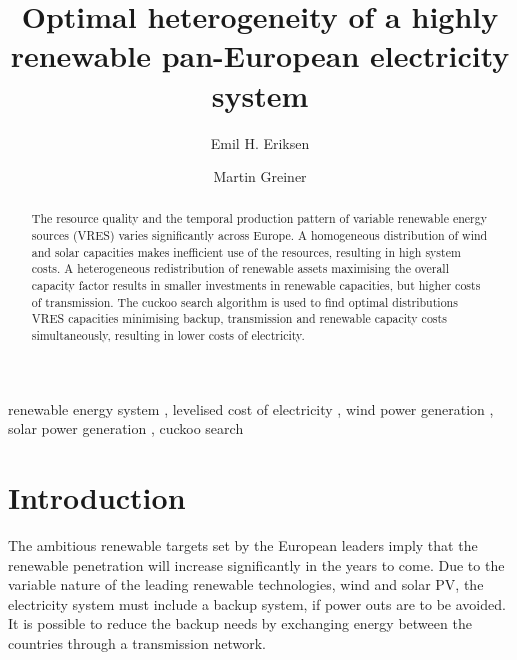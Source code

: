 \documentclass[a4paper, 12pt, sort&compress]{elsarticle}%
\begin{document}
\begin{frontmatter}

\title{Optimal heterogeneity of a highly renewable pan-European electricity system}

\author[label1]{Emil H. Eriksen}
\author[label2,label3]{Martin Greiner}
\address[label1]{Department of Physics and Astronomy, Aarhus University, 8000 Aarhus C,  Denmark}
\address[label2]{Department of Mathematics, Aarhus University, 8000 Aarhus C,  Denmark}
\address[label3]{Department of Engineering, Aarhus University, 8200 Aarhus,  Denmark}


\begin{abstract}
  The resource quality and the temporal production pattern of variable
  renewable energy sources (VRES) varies significantly across
  Europe. A homogeneous distribution of wind and solar capacities
  makes inefficient use of the resources, resulting in high system
  costs. A heterogeneous redistribution of renewable assets maximising
  the overall capacity factor results in smaller investments in
  renewable capacities, but higher costs of transmission. The cuckoo
  search algorithm is used to find optimal distributions VRES capacities minimising backup, transmission and renewable
  capacity costs simultaneously, resulting in lower costs of
  electricity.
\end{abstract}

\begin{keyword}
renewable energy system \sep 
levelised cost of electricity \sep
wind power generation \sep
solar power generation \sep
cuckoo search 
\end{keyword}

\end{frontmatter}


\section{Introduction}
\label{sec:one}

The ambitious renewable targets set by the European leaders\cite{eu2050} imply
that the renewable penetration will increase significantly in the
years to come. Due to the variable
nature of the leading renewable technologies, wind and solar PV, the
electricity system must include a backup system, if power outs are to
be avoided. It is possible to reduce the backup needs by exchanging
energy between the countries through a transmission
network\cite{rolando2014,sarah}.
\end{document}
